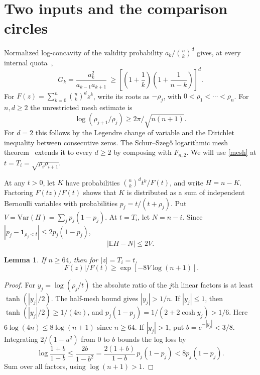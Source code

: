 \documentclass[11pt]{article}
\newtheorem{lemma}[theorem]{Lemma}
\newcommand{\E}{\mathbb E}
\newcommand{\Var}{\mathrm{Var}}
\begin{document}
\section{Two inputs and the comparison circles}
Normalized log-concavity of the validity probability $a_k/\binom nk^d$ gives, at every internal quota~\cite{orientation},
\begin{equation}\label{curv}
 G_k=\frac{a_k^2}{a_{k-1}a_{k+1}}\ \ge \left[\left(1+\frac1k\right)\left(1+\frac1{n-k}\right)\right]^d .
\end{equation}
For $F(z)=\sum_{k=0}^n\binom nk^d z^k$, write its roots as $-\rho_j$, with $0<\rho_1<\cdots<\rho_n$. For $n,d\ge2$ the unrestricted mesh estimate is~\cite{meshproof}
\begin{equation}\label{mesh}
 \log(\rho_{j+1}/\rho_j)\ge 2\pi/\sqrt{n(n+1)} .
\end{equation}
For $d=2$ this follows by the Legendre change of variable and the Dirichlet inequality between consecutive zeros. The Schur--Szeg\H{o} logarithmic mesh theorem~\cite{ksv} extends it to every $d\ge2$ by composing with $F_{n,2}$. We will use \eqref{mesh} at $t=T_i=\sqrt{\rho_i\rho_{i+1}}$.

At any $t>0$, let $K$ have probabilities $\binom nk^d t^k/F(t)$, and write $H=n-K$. Factoring $F(tz)/F(t)$ shows that $K$ is distributed as a sum of independent Bernoulli variables with probabilities $p_j=t/(t+\rho_j)$. Put $V=\Var(H)=\sum_j p_j(1-p_j)$. At $t=T_i$, let $N=n-i$. Since $|p_j-\mathbf1_{\rho_j<t}|\le2p_j(1-p_j)$,
\begin{equation}\label{mean}
 |\E H-N|\le2V .
\end{equation}

\begin{lemma}\label{circle}
If $n\ge64$, then for $|z|=T_i=t$,
\[
 |F(z)|/F(t)\ge \exp[-8V\log(n+1)] .
\]
\end{lemma}
\begin{proof}
For $y_j=\log(\rho_j/t)$ the absolute ratio of the $j$th linear factors is at least $\tanh(|y_j|/2)$. The half-mesh bound gives $|y_j|>1/n$. If $|y_j|\le1$, then $\tanh(|y_j|/2)\ge1/(4n)$, and $p_j(1-p_j)=1/(2+2\cosh y_j)>1/6$. Here $6\log(4n)\le8\log(n+1)$ since $n\ge64$. If $|y_j|>1$, put $b=e^{-|y_j|}<3/8$. Integrating $2/(1-u^2)$ from $0$ to $b$ bounds the log loss by
\[
 \log\frac{1+b}{1-b}\le\frac{2b}{1-b^2}
  =\frac{2(1+b)}{1-b}\,p_j(1-p_j)<8p_j(1-p_j).
\]
Sum over all factors, using $\log(n+1)>1$.
\end{proof}
\end{document}
